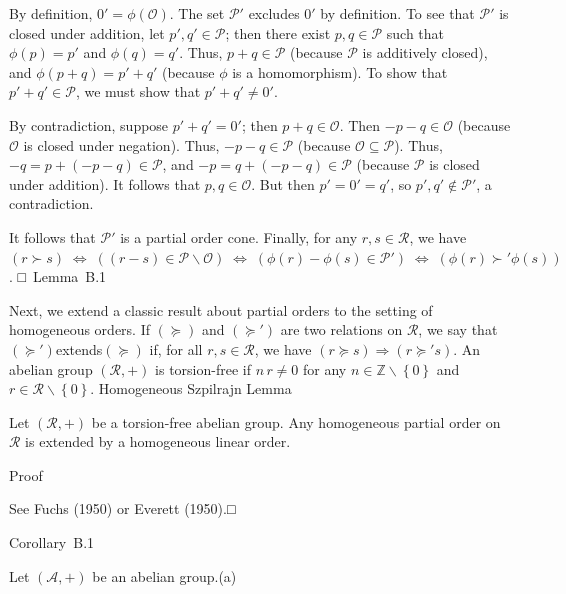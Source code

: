 \documentclass[
]{article}
\begin{document}
By definition, \(0' = \phi\left( \mathcal{O} \right)\). The set
\(\mathcal{P}'\) excludes \(0'\) by definition. To see that
\(\mathcal{P}'\) is closed under addition, let
\(p',q' \in \mathcal{P}\); then there exist \(p,q \in \mathcal{P}\) such
that \(\phi(p) = p'\) and \(\phi(q) = q'\). Thus,
\(p + q \in \mathcal{P}\) (because \(\mathcal{P}\) is additively
closed), and \(\phi(p + q) = p' + q'\) (because \(\phi\) is a
homomorphism). To show that \(p' + q' \in \mathcal{P}\), we must show
that \(p' + q' \neq 0'\).

By contradiction, suppose \(p' + q' = 0'\); then
\(p + q \in \mathcal{O}\). Then \(- p - q \in \mathcal{O}\) (because
\(\mathcal{O}\) is closed under negation). Thus,
\(- p - q \in \mathcal{P}\) (because
\(\mathcal{O} \subseteq \mathcal{P}\)). Thus,
\(- q = p + ( - p - q) \in \mathcal{P}\), and
\(- p = q + ( - p - q) \in \mathcal{P}\) (because \(\mathcal{P}\) is
closed under addition). It follows that \(p,q \in \mathcal{O}\). But
then \(p' = 0' = q'\), so \(p',q' \notin \mathcal{P}'\), a
contradiction.

It follows that \(\mathcal{P}'\) is a partial order cone. Finally, for
any \(r,s \in \mathcal{R}\), we have
\(\left. (r \succ s)\;\Longleftrightarrow\;\left( (r - s) \in \mathcal{P} \smallsetminus \mathcal{O} \right)\;\Longleftrightarrow\;\left( \phi(r) - \phi(s) \in \mathcal{P}' \right)\;\Longleftrightarrow\;\left( \phi(r) \succ '\phi(s) \right) \right.\).
□~Lemma~B.1

Next, we extend a classic result about partial orders to the setting of
homogeneous orders. If \(( \succeq )\) and \(\left( \succeq ' \right)\)
are two relations on \(\mathcal{R}\), we say that
\(\left( \succeq ' \right)\)extends\(( \succeq )\) if, for all
\(r,s \in \mathcal{R}\), we have
\(\left. (r \succeq s)\Longrightarrow\left( r \succeq 's \right) \right.\).
An abelian group \(\left( \mathcal{R}, + \right)\) is torsion-free if
\(n\, r \neq 0\) for any
\(n \in \mathbb{Z} \smallsetminus \left\{ 0 \right\}\) and
\(r \in \mathcal{R} \smallsetminus \left\{ 0 \right\}\). Homogeneous
Szpilrajn Lemma

Let \(\left( \mathcal{R}, + \right)\) be a torsion-free abelian group.
Any homogeneous partial order on \(\mathcal{R}\) is extended by a
homogeneous linear order.

Proof

See Fuchs (1950) or Everett (1950).□

Corollary~B.1

Let \(\left( \mathcal{A}, + \right)\) be an abelian group.(a)
\end{document}
